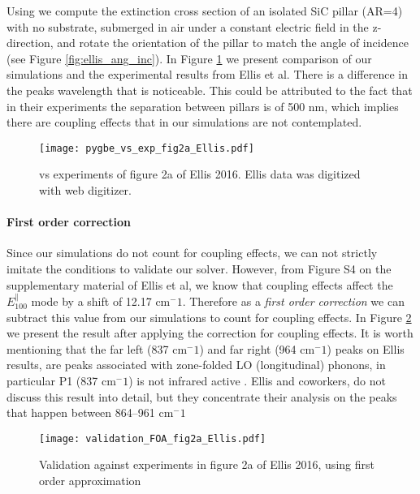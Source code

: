 Using \pygbe we compute the extinction cross section of an isolated SiC pillar (AR=4)
with no substrate, submerged in air under a constant electric field in the z-direction, 
and rotate the orientation of the pillar to match the angle of incidence (see Figure \ref{fig:ellis_ang_inc}).
In Figure \ref{fig:pygbe_vs_exp_2a} we present 
comparison of our simulations and the experimental results from Ellis et al. There is a 
difference in the peaks wavelength that is noticeable. This could be attributed to the
fact that in their experiments the separation between pillars is of 500 nm, which implies
there are coupling effects that in our simulations are not contemplated.  

\begin{figure}
    \centering
    \texttt{[image: pygbe\_vs\_exp\_fig2a\_Ellis.pdf]} 
    \caption{\pygbe vs experiments of figure 2a of Ellis 2016. Ellis data 
    was digitized with web digitizer.}
    \label{fig:pygbe_vs_exp_2a}
 \end{figure}

\paragraph{First order correction}

Since our simulations do not count for coupling effects, we can not strictly imitate 
the conditions to validate our solver. However, from Figure S4 on the supplementary 
material of Ellis et al, we know that coupling effects affect the $E^{\parallel}_{100}$ 
mode by a shift of 12.17 cm$^-1$. Therefore as a \textit{first order correction} we can 
subtract this value from our simulations to count for coupling effects. In Figure 
\ref{fig:val_2a} we present the result after applying the correction for coupling effects.
It is worth mentioning that the far left (837 cm$^-1$) and far right (964 cm$^-1$) peaks 
on Ellis results, are peaks associated with zone-folded LO (longitudinal) phonons, in 
particular P1 (837 cm$^-1$) is not infrared active \cite{ellis2016}. Ellis and coworkers, 
do not discuss this result into detail, but they concentrate their analysis on the peaks
that happen between 864–961 cm$^-1$ 

\begin{figure}
    \centering
    \texttt{[image: validation\_FOA\_fig2a\_Ellis.pdf]} 
    \caption{Validation against experiments in figure 2a of Ellis 2016, using first order approximation}
    \label{fig:val_2a}
 \end{figure}

